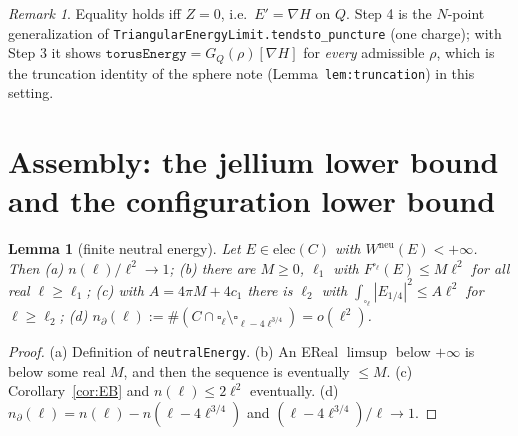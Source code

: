 \documentclass[11pt]{article}
\newtheorem{lemma}[theorem]{Lemma}
\theoremstyle{definition}
\theoremstyle{remark}
\newtheorem{remark}[theorem]{Remark}
\newcommand{\Wneu}{W^{\mathrm{neu}}}
\begin{document}
\begin{remark}
Equality holds iff $Z=0$, i.e.\ $E'=\nabla H$ on $Q$. Step 4 is the $N$-point generalization of \texttt{TriangularEnergyLimit.tendsto\_puncture} (one charge);
with Step 3 it shows $\texttt{torusEnergy}=G_Q(\rho)[\nabla H]$ for \emph{every} admissible $\rho$, which is the truncation identity of the sphere note (Lemma~\texttt{lem:truncation}) in this
setting.
\end{remark}

\section{Assembly: the jellium lower bound and the configuration lower bound}\label{sec:assembly}

\begin{lemma}[finite neutral energy]\label{lem:finiteW}
Let $E\in\mathrm{elec}(C)$ with $\Wneu(E)<+\infty$. Then (a) $n(\ell)/\ell^2\to1$; (b) there are $M\ge0$, $\ell_1$ with $F^{\square_\ell}(E)\le M\ell^2$ for all real $\ell\ge\ell_1$;
(c) with $A=4\pi M+4c_1$ there is $\ell_2$ with $\int_{\square_\ell}|E_{1/4}|^2\le A\ell^2$ for $\ell\ge\ell_2$; (d) $n_\partial(\ell):=\#(C\cap\square_\ell\setminus\square_{\ell-4\ell^{3/4}})=o(\ell^2)$.
\end{lemma}
\begin{proof}
(a) Definition of \texttt{neutralEnergy}. (b) An EReal $\limsup$ below $+\infty$ is below some real $M$, and then the sequence is eventually $\le M$.
(c) Corollary~\ref{cor:EB} and $n(\ell)\le2\ell^2$ eventually. (d) $n_\partial(\ell)=n(\ell)-n(\ell-4\ell^{3/4})$ and $(\ell-4\ell^{3/4})/\ell\to1$.
\end{proof}
\end{document}
